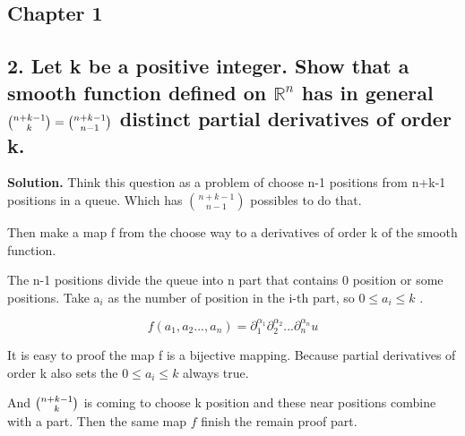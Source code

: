 \documentclass[a4paper]{book}
\newenvironment{solution}%
{\noindent\textbf{Solution.}}%
{\qedhere}
\numberwithin{equation}{chapter}
\theoremstyle{definition}
\begin{document}
\begin{multicols}{2}
\setlength{\columnseprule}{0.2pt}  

\section{Chapter 1}
\subsection{2. Let k be a positive integer. Show that a smooth function defined on $\mathbb{R}^n$ has in general 
$%
	\tbinom{n+k-1}{k} = \tbinom{n+k-1}{n-1}
$
distinct partial derivatives of order k.}

\begin{solution}
	Think this question as a problem of choose n-1 positions from n+k-1 positions in a queue. Which has $\binom{n+k-1}{n-1}$ possibles to do that.
	
	Then make a map f from the choose way to a derivatives of order k of the smooth function.
	
	The n-1 positions divide the queue into n part that contains 0 position or some positions. Take a$_{i}$ as the number of position in the i-th part, so $0 \leq a_{i} \leq k$ .
	
	$$f(a_1, a_2 ..., a_n) = \partial_{1}^{\alpha_{1}}\partial_{2}^{\alpha_{2}}...\partial_{n}^{\alpha_{n}}u $$
	
	It is easy to proof the map f is a bijective mapping. Because partial derivatives of order k also sets the $0 \leq a_{i} \leq k$ always true.
	
	And $\tbinom{n+k-1}{k}$ is coming to choose k position and these near positions combine with a part. Then the same map $f$ finish the remain proof part.  
\end{solution}


%


\end{multicols}
\end{document}
